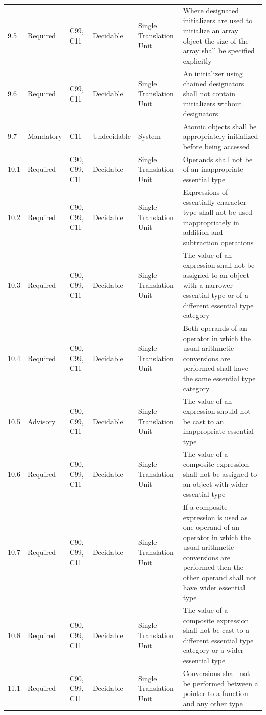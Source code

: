 \documentclass[11pt]{article}
\begin{document}
{\begin{longtable}{@{}p{1.0cm}p{1.6cm}p{1.8cm}p{2.0cm}p{1.6cm}p{7.4cm}@{}}
9.5 & Required & C99, C11 & Decidable & Single Translation Unit & Where designated initializers are used to initialize an array object the size of the array shall be specified explicitly \\
9.6 & Required & C99, C11 & Decidable & Single Translation Unit & An initializer using chained designators shall not contain initializers without designators \\
9.7 & Mandatory & C11 & Undecidable & System & Atomic objects shall be appropriately initialized before being accessed \\
10.1 & Required & C90, C99, C11 & Decidable & Single Translation Unit & Operands shall not be of an inappropriate essential type \\
10.2 & Required & C90, C99, C11 & Decidable & Single Translation Unit & Expressions of essentially character type shall not be used inappropriately in addition and subtraction operations \\
10.3 & Required & C90, C99, C11 & Decidable & Single Translation Unit & The value of an expression shall not be assigned to an object with a narrower essential type or of a different essential type category \\
10.4 & Required & C90, C99, C11 & Decidable & Single Translation Unit & Both operands of an operator in which the usual arithmetic conversions are performed shall have the same essential type category \\
10.5 & Advisory & C90, C99, C11 & Decidable & Single Translation Unit & The value of an expression should not be cast to an inappropriate essential type \\
10.6 & Required & C90, C99, C11 & Decidable & Single Translation Unit & The value of a composite expression shall not be assigned to an object with wider essential type \\
10.7 & Required & C90, C99, C11 & Decidable & Single Translation Unit & If a composite expression is used as one operand of an operator in which the usual arithmetic conversions are performed then the other operand shall not have wider essential type \\
10.8 & Required & C90, C99, C11 & Decidable & Single Translation Unit & The value of a composite expression shall not be cast to a different essential type category or a wider essential type \\
11.1 & Required & C90, C99, C11 & Decidable & Single Translation Unit & Conversions shall not be performed between a pointer to a function and any other type \\

\end{longtable}}
\end{document}
